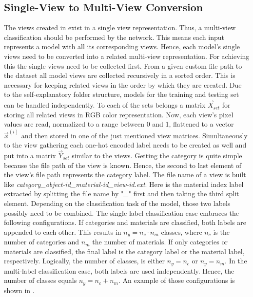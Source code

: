 \subsection{Single-View to Multi-View Conversion}
\label{sec:prepare-data-view-conversion}
The views created in  exist in a single view representation.
Thus, a multi-view classification should be performed by the network.
This means each input represents a model with all its corresponding views.
Hence, each model's single views need to be converted into a related multi-view representation.
For achieving this the single views need to be collected first.
From a given custom file path to the dataset all model views are collected recursively in a sorted order.
This is necessary for keeping related views in the order by which they are created.
Due to the self-explanatory folder structure, models for the training and testing set can be handled independently.
To each of the sets belongs a matrix $\vec{X}_{set}$ for storing all related views in RGB color representation.
Now, each view's pixel values are read, normalized to a range between 0 and 1, flattened to a vector $\vec{x}^{(i)}$ and then stored in one of the just mentioned view matrices.
Simultaneously to the view gathering each one-hot encoded label needs to be created as well and put into a matrix $\vec{Y}_{set}$ similar to the views.
Getting the category is quite simple because the file path of the view is known.
Hence, the second to last element of the view's file path represents the category label.
The file name of a view is built like \textit{category\_object-id\_material-id\_view-id.ext}.
Here is the material index label extracted by splitting the file name by "\textit{\_}" first and then taking the third split element.
Depending on the classification task of the model, those two labels possibly need to be combined.
The single-label classification case embraces the following configurations.
If categories and materials are classified, both labels are appended to each other.
This results in $n_y = n_c \cdot n_m$ classes, where $n_c$ is the number of categories and $n_m$ the number of materials.
If only categories or materials are classified, the final label is the category label or the material label, respectively.
Logically, the number of classes, is either $n_y = n_c$ or $n_y = n_m$.
In the multi-label classification case, both labels are used independently.
Hence, the number of classes equals $n_y = n_c + n_m$.
An example of those configurations is shown in .
